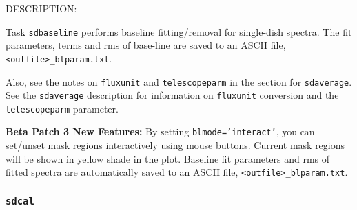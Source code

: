     DESCRIPTION:

    Task {\tt sdbaseline} performs baseline fitting/removal for single-dish spectra.
    The fit parameters, terms and rms of base-line are saved to an ASCII
    file, {\tt <outfile>\_blparam.txt}.

    Also, see the notes on {\tt fluxunit} and {\tt telescopeparm} in the section for
    {\tt sdaverage}.
    See the {\tt sdaverage} description for information on {\tt fluxunit} 
    conversion and the {\tt telescopeparm} parameter.

    {\bf Beta Patch 3 New Features:}
    By setting {\tt blmode='interact'}, you can set/unset mask regions interactively using
    mouse buttons. Current mask regions will be shown in yellow shade in the plot.
    Baseline fit parameters and rms of fitted spectra are automatically saved to an
    ASCII file, {\tt <outfile>\_blparam.txt}.
  
\subsubsection{{\tt sdcal}}
\label{section:sd.sdtasks.tasks.sdcal}

